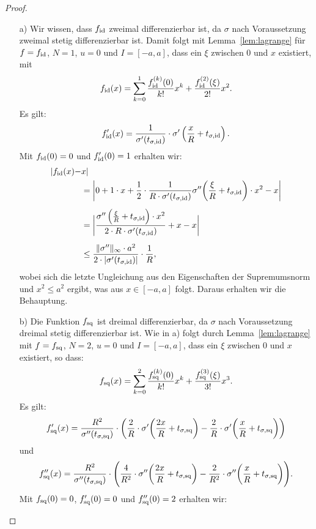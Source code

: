 \begin{proof}
	\begin{itemize}
  	\item[a)] Wir wissen, dass $f_{\mathrm{id}}$  zweimal differenzierbar ist, da $\sigma$ nach Voraussetzung zweimal stetig differenzierbar ist. Damit folgt mit Lemma~\ref{lem:lagrange} für $f = f_{\mathrm{id}}$, $N = 1$, $u = 0$ und $I = [-a, a]$, dass ein $\xi$ zwischen $0$ und $x$ existiert, mit
$$f_{\mathrm{id}}(x) = \sum_{k = 0}^1 \frac{f_{\mathrm{id}}^{(k)}(0)}{k!}x^k + \frac{f_{\mathrm{id}}^{(2)}(\xi)}{2!}x^{2}.$$
Es gilt:
$$
f_{\mathrm{id}}'(x) = \frac{1}{\sigma'(t_{\sigma,\mathrm{id}})} \cdot \sigma'\left(\frac{x}{R} + t_{\sigma,\mathrm{id}}\right).
$$
Mit $f_{\mathrm{id}}(0) = 0$ und $f_{\mathrm{id}}'(0) = 1$ erhalten wir:
  	\begin{equation*}
  	\begin{split}
  	 |f_{\mathrm{id}}(x) -  & x| \\
  	& = \bigg|0 + 1 \cdot x + \frac{1}{2} \cdot \frac{1}{R \cdot \sigma'(t_{\sigma,\mathrm{id}})} \sigma''\bigg(\frac{\xi}{R} + t_{\sigma,\mathrm{id}}\bigg) \cdot x^2 - x \bigg| \\[0.5em]
  	& = \bigg| \frac{\sigma''\left(\frac{\xi}{R} + t_{\sigma,\mathrm{id}}\right)  \cdot x^2}{2 \cdot R \cdot \sigma'(t_{\sigma, \mathrm{id}})} + x - x\bigg| \\[0.5em]
  	& \leq \frac{\| \sigma'' \|_{\infty} \cdot a^2}{2 \cdot |\sigma'(t_{\sigma, \mathrm{id}})|} \cdot \frac{1}{R},
  	\end{split}
  	\end{equation*}
  	wobei sich die letzte Ungleichung aus den Eigenschaften der Supremumsnorm und $x^2 \leq a^2$ ergibt, was aus $x \in [-a,a]$ folgt. Daraus erhalten wir die Behauptung.
  	\item[b)]  Die Funktion $f_{\mathrm{sq}}$ ist dreimal differenzierbar, da $\sigma$ nach Voraussetzung dreimal stetig differenzierbar ist. Wie in a) folgt durch Lemma~\ref{lem:lagrange} mit $f = f_{\mathrm{sq}}$, $N = 2$, $u = 0$ und $I = [-a, a]$, dass ein $\xi$ zwischen $0$ und $x$ existiert, so dass:
$$f_{\mathrm{sq}}(x) = \sum_{k = 0}^2 \frac{f_{\mathrm{sq}}^{(k)}(0)}{k!}x^k + \frac{f_{\mathrm{sq}}^{(3)}(\xi)}{3!}x^{3}.$$
Es gilt:
$$
f_{\mathrm{sq}}'(x) = \frac{R^2}{\sigma''(t_{\sigma, \mathrm{sq}})} \cdot \left(\frac{2}{R} \cdot\sigma'\bigg(\frac{2x}{R} + t_{\sigma, \mathrm{sq}}\bigg) - \frac{2}{R} \cdot \sigma'\bigg(\frac{x}{R} + t_{\sigma, \mathrm{sq}}\bigg)\right)
$$
und 
$$
f_{\mathrm{sq}}''(x) = \frac{R^2}{\sigma''(t_{\sigma, \mathrm{sq}})} \cdot \Bigg(\frac{4}{R^2} \cdot\sigma''\bigg(\frac{2x}{R} + t_{\sigma, \mathrm{sq}}\bigg) - \frac{2}{R^2} \cdot \sigma''\bigg(\frac{x}{R} + t_{\sigma, \mathrm{sq}}\bigg)\Bigg).
$$
Mit $f_{\mathrm{sq}}(0) = 0$, $f_{\mathrm{sq}}'(0) = 0$ und $f_{\mathrm{sq}}''(0) = 2$ erhalten wir:

\end{itemize}
\end{proof}
